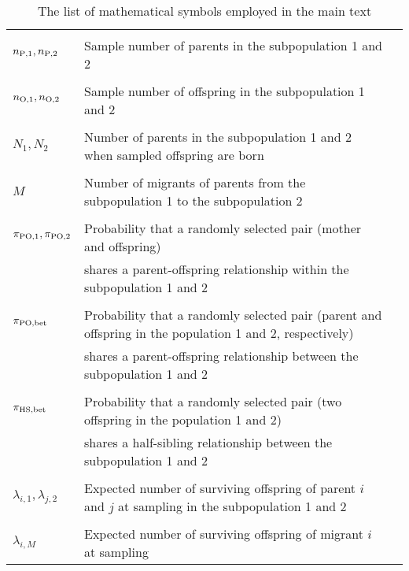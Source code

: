 \documentclass[AMA,STIX1COL]{WileyNJD-v2}
\begin{document}
\renewcommand{\arraystretch}{0.6}
\begin{table}[tb]
\begin{center}
   \caption[]{The list of mathematical symbols employed in the main text}
    \textbf {}\\[-4mm]
    \begin{tabular}{llc} \hline
       & & \\
	$n_{\rm P,1}, n_{\rm P, 2}$			& Sample number of parents in the subpopulation 1 and 2\\ 
		                						& \\
	$n_{\rm O, 1}, n_{\rm O, 2}$			& Sample number of offspring in the subpopulation 1 and 2\\ 
		                						& \\
	$N_{1}, N_{2}$						& Number of parents in the subpopulation 1 and 2 when sampled offspring are born\\
		                						& \\
	$M$								& Number of migrants of parents from the subpopulation 1 to the subpopulation 2\\
		                						& \\
	$\pi_{\rm PO,1}, \pi_{\rm PO,2}$		& Probability that a randomly selected pair (mother and offspring) \\
	                							& shares a parent-offspring relationship within the subpopulation 1 and 2\\
									& \\
	$\pi_{\rm PO, bet}$					& Probability that a randomly selected pair (parent and offspring in the population 1 and 2, respectively) \\
	                							& shares a parent-offspring relationship between the subpopulation 1 and 2\\
									& \\
	$\pi_{\rm HS, bet}$					& Probability that a randomly selected pair (two offspring in the population 1 and 2) \\
	                							& shares a half-sibling relationship between the subpopulation 1 and 2\\
					                			& \\
	$\lambda_{i,1}, \lambda_{j,2}$			& Expected number of surviving offspring of parent $i$ and $j$ at sampling in the subpopulation 1 and 2\\
		                						& \\
	$\lambda_{i, M}$					& Expected number of surviving offspring of migrant $i$ at sampling\\

\end{tabular}
\end{center}
\end{table}
\end{document}

